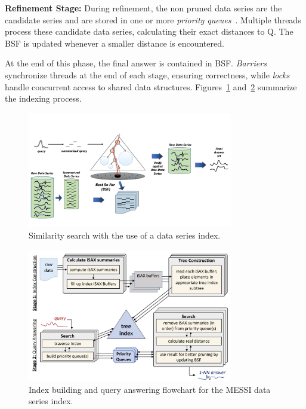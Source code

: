 \noindent\textbf{Refinement Stage:} During refinement, the non pruned data series 
are the candidate series and are stored in one or more \textit{priority queues}~\cite{parisplus,PFP21-I,PFP21-II}.
Multiple threads process these candidate data series, calculating their exact
distances to Q. The BSF is updated whenever a smaller distance is encountered.

At the end of this phase, the final answer is contained in BSF.  
\textit{Barriers} synchronize threads at the end of each stage, ensuring correctness,  
while \textit{locks} handle concurrent access to shared data structures.  
Figures~\ref{fig:example} and~\ref{fig:example2} summarize the indexing process.  

\begin{figure}[H]
    \centering
    \includegraphics[width=0.8\textwidth]{figures/prelem/iSAX-index.pdf}
    \caption{Similarity search with the use of a data series index.}
    \label{fig:example}
    \vspace{-0.5cm} %
\end{figure}

\begin{figure}[H]
    \centering
    \includegraphics[width=0.8\textwidth]{figures/prelem/flowchart2.pdf}
    \caption{Index building and query answering flowchart for the MESSI data series index.}
    \label{fig:example2}
    \vspace{-0.5cm} %
\end{figure}



